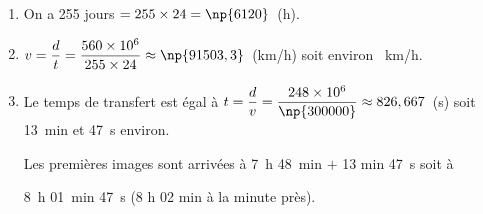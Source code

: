 \documentclass[10pt]{article}
\begin{document}
\setlength\parindent{0mm}
\pagestyle{fancy}
\thispagestyle{empty}
    
    
    




\medskip

% 
%
 
\begin{enumerate}
\item %
On a 255 jours $ = 255 \times 24 = \np{6120}$~(h). 
\item %
$v = \dfrac{d}{t}  =  \dfrac{560 \times 10^6}{255 \times 24} \approx \np{91503,3}$~(km/h) soit environ ~km/h. 
\item %

% 
% 
% 
Le temps de transfert est égal à  $t = \dfrac{d}{v} = \dfrac{248 \times 10^6}{\np{300000}} \approx 826,667$~(s) soit 13~min et 47~s environ.

Les premières images sont arrivées à 7~h 48~min $+$ 13 min 47~s soit à 

8~h 01~min 47~s (8 h 02 min à la minute près).
\end{enumerate}

%
\end{document}

